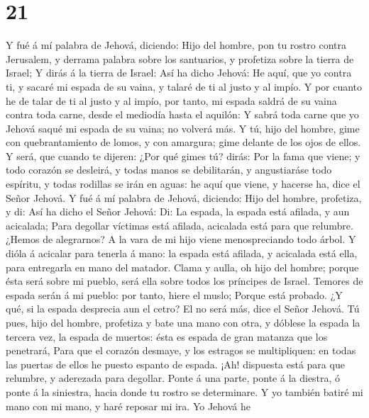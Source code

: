 \hypertarget{section-20}{%
\section{21}\label{section-20}}

 Y fué á mí palabra de Jehová, diciendo:  Hijo
del hombre, pon tu rostro contra Jerusalem, y derrama palabra sobre los
santuarios, y profetiza sobre la tierra de Israel;  Y dirás
á la tierra de Israel: Así ha dicho Jehová: He aquí, que yo contra ti, y
sacaré mi espada de su vaina, y talaré de ti al justo y al impío.
 Y por cuanto he de talar de ti al justo y al impío, por
tanto, mi espada saldrá de su vaina contra toda carne, desde el mediodía
hasta el aquilón:  Y sabrá toda carne que yo Jehová saqué mi
espada de su vaina; no volverá más.  Y tú, hijo del hombre,
gime con quebrantamiento de lomos, y con amargura; gime delante de los
ojos de ellos.  Y será, que cuando te dijeren: ¿Por qué
gimes tú? dirás: Por la fama que viene; y todo corazón se desleirá, y
todas manos se debilitarán, y angustiaráse todo espíritu, y todas
rodillas se irán en aguas: he aquí que viene, y hacerse ha, dice el
Señor Jehová.  Y fué á mí palabra de Jehová, diciendo:
 Hijo del hombre, profetiza, y di: Así ha dicho el Señor
Jehová: Di: La espada, la espada está afilada, y aun acicalada;
 Para degollar víctimas está afilada, acicalada está para
que relumbre. ¿Hemos de alegrarnos? A la vara de mi hijo viene
menospreciando todo árbol.  Y dióla á acicalar para tenerla
á mano: la espada está afilada, y acicalada está ella, para entregarla
en mano del matador.  Clama y aulla, oh hijo del hombre;
porque ésta será sobre mi pueblo, será ella sobre todos los príncipes de
Israel. Temores de espada serán á mi pueblo: por tanto, hiere el muslo;
 Porque está probado. ¿Y qué, si la espada desprecia aun el
cetro? El no será más, dice el Señor Jehová.  Tú pues, hijo
del hombre, profetiza y bate una mano con otra, y dóblese la espada la
tercera vez, la espada de muertos: ésta es espada de gran matanza que
los penetrará,  Para que el corazón desmaye, y los estragos
se multipliquen: en todas las puertas de ellos he puesto espanto de
espada. ¡Ah! dispuesta está para que relumbre, y aderezada para
degollar.  Ponte á una parte, ponte á la diestra, ó ponte á
la siniestra, hacia donde tu rostro se determinare.  Y yo
también batiré mi mano con mi mano, y haré reposar mi ira. Yo Jehová he
